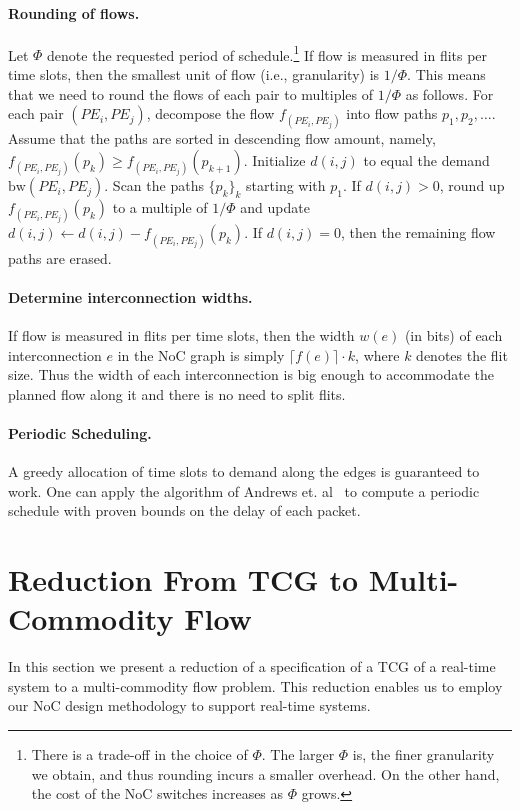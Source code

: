 \documentclass[a4paper,12pt]{article}
\newenvironment{proof sketch}[1]{\noindent {\emph{Proof sketch of #1:}}}{\hfill \qed}
\newcommand{\bw}{\textrm{bw}}
\begin{document}
\paragraph{Rounding of flows.}
Let $\Phi$ denote the requested period of schedule.\footnote{There is a trade-off in
  the choice of $\Phi$. The larger $\Phi$ is, the finer granularity we obtain, and
  thus rounding incurs a smaller overhead. On the other hand, the cost of the NoC
  switches increases as $\Phi$ grows. }  If flow is measured in flits per time slots,
then the smallest unit of flow (i.e., granularity) is $1/\Phi$.  This means that we
need to round the flows of each pair to multiples of $1/\Phi$ as follows. For each
pair $(PE_i,PE_j)$, decompose the flow $f_{(PE_i,PE_j)}$ into flow paths
$p_1,p_2,\ldots$.  Assume that the paths are sorted in descending flow amount,
namely, $f_{(PE_i,PE_j)}(p_k) \geq f_{(PE_i,PE_j)}(p_{k+1})$.  Initialize $d(i,j)$ to
equal the demand $\bw(PE_i,PE_j)$.  Scan the paths $\{p_k\}_k$ starting with $p_1$.
If $d(i,j)>0$, round up $f_{(PE_i,PE_j)}(p_k)$ to a multiple of $1/\Phi$ and update
$d(i,j)\gets d(i,j)-f_{(PE_i,PE_j)}(p_k)$.  If $d(i,j)=0$, then the remaining flow
paths are erased.

\paragraph{Determine interconnection widths.}
If flow is measured in flits per time slots, then the width $w(e)$ (in bits) of each
interconnection $e$ in the NoC graph is simply $\lceil f(e) \rceil \cdot k$, where
$k$ denotes the flit size. Thus the width of each interconnection is big enough to
accommodate the planned flow along it and there is no need to split flits.

\paragraph{Periodic Scheduling.}  A greedy allocation of time
slots to demand along the edges is guaranteed to work. One can apply the algorithm of
Andrews et. al~\cite{andrews2000general} to compute a periodic schedule with proven
bounds on the delay of each packet.
 



\section{Reduction From TCG to Multi-Commodity Flow}\label{sec:MCF}
In this section we present a reduction of a specification of a TCG of a real-time
system to a multi-commodity flow problem.  This reduction enables us to employ our
NoC design methodology to support real-time systems.
\end{document}
